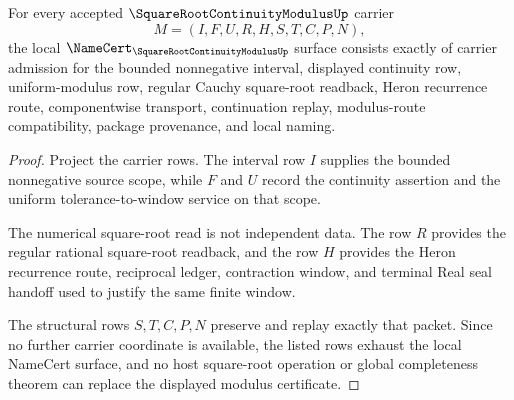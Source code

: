 \begin{theorem}
\label{thm:square-root-continuity-modulus-namecert-obligations}
For every accepted $\SquareRootContinuityModulusUp$ carrier
$$
M=(I,F,U,R,H,S,T,C,P,N),
$$
the local $\NameCert_{\SquareRootContinuityModulusUp}$ surface consists exactly of carrier admission for the bounded nonnegative interval, displayed continuity row, uniform-modulus row, regular Cauchy square-root readback, Heron recurrence route, componentwise transport, continuation replay, modulus-route compatibility, package provenance, and local naming.
\end{theorem}
\begin{proof}
Project the carrier rows. The interval row $I$ supplies the bounded nonnegative source scope, while $F$ and $U$ record the continuity assertion and the uniform tolerance-to-window service on that scope.

The numerical square-root read is not independent data. The row $R$ provides the regular rational square-root readback, and the row $H$ provides the Heron recurrence route, reciprocal ledger, contraction window, and terminal Real seal handoff used to justify the same finite window.

The structural rows $S,T,C,P,N$ preserve and replay exactly that packet. Since no further carrier coordinate is available, the listed rows exhaust the local NameCert surface, and no host square-root operation or global completeness theorem can replace the displayed modulus certificate.
\end{proof}

